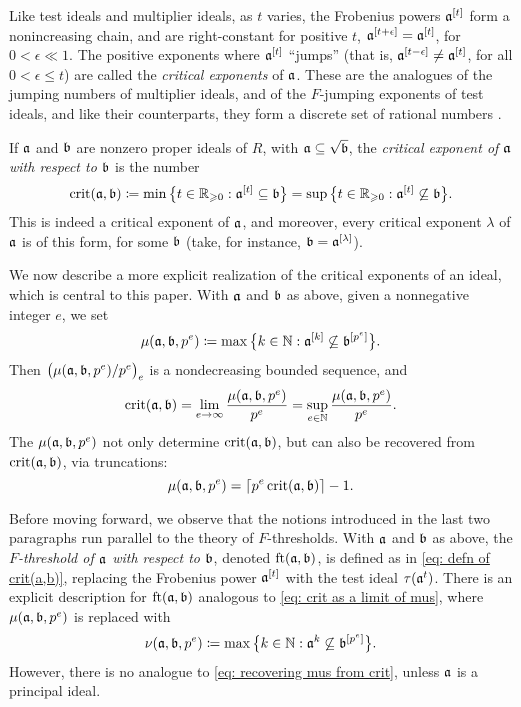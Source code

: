 \documentclass[11pt]{amsart}
\begin{document}
Like test ideals and multiplier ideals, as $t$ varies, the Frobenius powers $\mathfrak{a}^{[t]}$ form a nonincreasing chain, and are right-constant for positive $t$, \ie $\mathfrak{a}^{[t+\epsilon]} = \mathfrak{a}^{[t]}$, for $0<\epsilon \ll 1$.
The positive exponents where $\mathfrak{a}^{[t]}$ ``jumps'' (that is, $\mathfrak{a}^{[t-\epsilon]}\ne \mathfrak{a}^{[t]}$, for all $0<\epsilon \le t$) are called the \emph{critical exponents} of $\mathfrak{a}$.
These are the analogues of the jumping numbers of multiplier ideals, and of the $F$-jumping exponents of test ideals, and like their counterparts, they form a discrete set of rational numbers \cite[Corollary~5.8]{hernandez+etal.frobenius_powers}.

If $\mathfrak{a}$ and $\mathfrak{b}$ are nonzero proper ideals of $R$, with $\mathfrak{a} \subseteq \sqrt{\mathfrak{b}}$, the \emph{critical exponent of $\mathfrak{a}$ with respect to $\mathfrak{b}$} is the number
\begin{equation}\label{eq: defn of crit(a,b)}
   \operatorname{crit}(\mathfrak{a},\mathfrak{b}) \coloneqq \min\big\{t\in \mathbb{R}_{\geqslant 0}: \mathfrak{a}^{[t]} \subseteq \mathfrak{b}\big\}
      = \sup\big\{t\in \mathbb{R}_{\geqslant 0}: \mathfrak{a}^{[t]} \not\subseteq \mathfrak{b}\big\}.
\end{equation}
This is indeed a critical exponent of $\mathfrak{a}$, and moreover, every critical exponent $\lambda$ of $\mathfrak{a}$ is of this form, for some $\mathfrak{b}$ (take, for instance, $\mathfrak{b} = \mathfrak{a}^{[\lambda]}$).

We now describe a more explicit realization of the critical exponents of an ideal, which is central to this paper.
With $\mathfrak{a}$ and $\mathfrak{b}$ as above, given a nonnegative integer $e$, we set
\[\mu(\mathfrak{a},\mathfrak{b},p^e) \coloneqq \max\big\{k\in \mathbb{N} : \mathfrak{a}^{[k]} \not\subseteq \mathfrak{b}^{[p^e]}\big\}.\]
Then $\big(\mu(\mathfrak{a},\mathfrak{b},p^e)/p^e\big)_e$ is a nondecreasing bounded sequence, and 
\begin{equation}\label{eq: crit as a limit of mus}
   \operatorname{crit}(\mathfrak{a},\mathfrak{b}) = \lim_{e\to \infty} \frac{\mu(\mathfrak{a},\mathfrak{b},p^e)}{p^e} = \sup_{e\in \mathbb{N}} \frac{\mu(\mathfrak{a},\mathfrak{b},p^e)}{p^e}.
\end{equation}
The $\mu(\mathfrak{a},\mathfrak{b},p^e)$ not only determine $\operatorname{crit}(\mathfrak{a},\mathfrak{b})$, but can also be recovered from $\operatorname{crit}(\mathfrak{a},\mathfrak{b})$, via truncations:
\begin{equation}\label{eq: recovering mus from crit}
   \mu(\mathfrak{a},\mathfrak{b},p^e) = \left\lceil p^e\operatorname{crit}(\mathfrak{a},\mathfrak{b}) \right\rceil - 1.
\end{equation}

Before moving forward, we observe that the notions introduced in the last two paragraphs run parallel to the theory of $F$-thresholds.
With $\mathfrak{a}$ and $\mathfrak{b}$ as above, the \emph{$F$-threshold of $\mathfrak{a}$ with respect to $\mathfrak{b}$}, denoted $\operatorname{ft}(\mathfrak{a}, \mathfrak{b})$, is defined as in \eqref{eq: defn of crit(a,b)}, replacing the Frobenius power $\mathfrak{a}^{[t]}$ with the test ideal $\tau(\mathfrak{a}^t)$.
There is an explicit description for $\operatorname{ft}(\mathfrak{a}, \mathfrak{b})$ analogous to \eqref{eq: crit as a limit of mus}, where $\mu(\mathfrak{a},\mathfrak{b},p^e)$ is replaced with
\[\nu(\mathfrak{a},\mathfrak{b},p^e) \coloneqq \max\big\{k\in \mathbb{N} : \mathfrak{a}^{k} \not\subseteq \mathfrak{b}^{[p^e]}\big\}.\]
However, there is no analogue to \eqref{eq: recovering mus from crit}, unless $\mathfrak{a}$ is a principal ideal.
\end{document}
